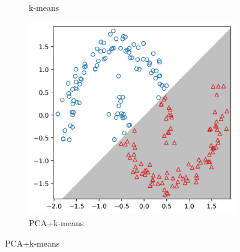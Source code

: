 \documentclass[10pt,journal,compsoc]{IEEEtran}
\begin{document}
\begin{figure}[!t]
\begin{subfigure}{.33\textwidth}
            \caption{k-means}
            \label{fig:kmeans}
        \end{subfigure}
        \begin{subfigure}{.33\textwidth}
            \centering
            \includegraphics[width=0.98\linewidth]{figures/pca-kmeans.png}  
            \caption{PCA+k-means}
            \label{fig:pcakmeans}
        \end{subfigure}
        \newline
        

\end{figure}
\end{document}
